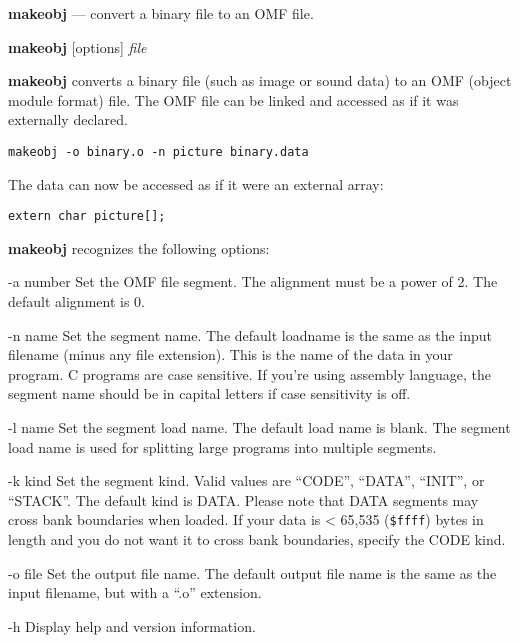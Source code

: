 \documentclass{article}
\def\makeobj{\textbf{makeobj} }
\begin{document}
\makeobj --- convert a binary file to an OMF file.


\makeobj [options] \textit{file}


\makeobj converts a binary file (such as image or sound data) to an OMF (object module format) file.  The OMF file can be linked and accessed as if it was externally declared.


\begin{verbatim}
makeobj -o binary.o -n picture binary.data
\end{verbatim}

The data can now be accessed as if it were an external array:

\begin{verbatim}
extern char picture[];
\end{verbatim}



\makeobj recognizes the following options:
\begin{optionlist}
	\item [-a number] Set the OMF file segment.  The alignment must be a power of 2.  The 
	default alignment is 0.
	\item [-n name]
	Set the segment name. The default loadname is the same as the input filename 
	(minus any file extension). This is the name of the data in your program. C programs
	are case sensitive. If you're using assembly language, the segment name should be
	in capital letters if case sensitivity is off. 
	\item [-l name]
	Set the segment load name.  The default load name is blank.  The segment load name is used
	for splitting large programs into multiple segments. 
	\item [-k kind]
	Set the segment kind.  Valid values are ``CODE'', ``DATA'', ``INIT'', or ``STACK''.  
	The default kind is DATA.  Please note that DATA segments may cross bank boundaries when
	loaded.  If your data is < 65,535 (\texttt{\$ffff}) bytes in length and you do not want it to cross
	bank boundaries, specify the CODE kind. 
	\item [-o file]
	Set the output file name.  The default output file name is the same as the input filename, 
	but with a ``.o'' extension.
	\item [-h]
	Display help and version information.
	
\end{optionlist}
\end{document}

